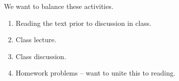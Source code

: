 We want to balance these activities.
\begin{enumerate}
\item Reading the text prior to discussion in class.
\item Class lecture.
\item Class discussion.
\item Homework problems -- want to unite this to reading.
\end{enumerate}

